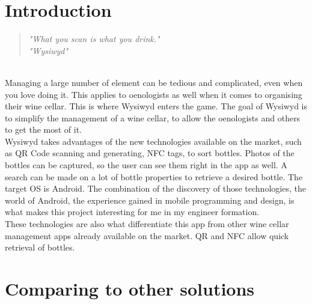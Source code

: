  

\thispagestyle{empty}

\titleTH %

\newpage

\tableofcontents

\newpage


\section{Introduction}

\begin{quotation}
\center \emph{"What you scan is what you drink."\\ "Wysiwyd"}
\end{quotation}

~\\

Managing a large number of element can be tedious and complicated, even when you love doing it. This applies to oenologists as well when it comes to organising their wine cellar. This is where Wysiwyd enters the game. The goal of Wysiwyd is to simplify the management of a wine cellar, to allow the oenologists and others to get the most of it.\\

Wysiwyd takes advantages of the new technologies available on the market, such as QR Code scanning and generating, NFC tags, to sort bottles. Photos of the bottles can be captured, so the user can see them right in the app as well. A search can be made on a lot of bottle properties to retrieve a desired bottle. The target OS is Android. The combination of the discovery of those technologies, the world of Android, the experience gained in mobile programming and design, is what makes this project interesting for me in my engineer formation.\\

These technologies are also what differentiate this app from other wine cellar management apps already available on the market. QR and NFC allow quick retrieval of bottles.

\section{Comparing to other solutions}

